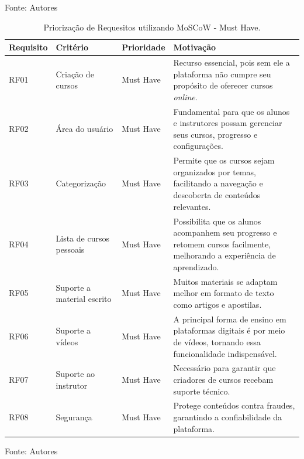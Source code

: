 \begin{apendicesenv}
\begin{table}[h]
\vspace{5mm}
{\footnotesize Fonte: Autores} 

\end{table}


\begin{table}[h]
    \centering
    \caption{Priorização de Requesitos utilizando MoSCoW - Must Have.}
    \label{tab:priorizacao_moscow}
    \begin{adjustbox}{width=\textwidth}
        \begin{tabular}{|p{2.5cm}|p{5cm}|p{5cm}|p{4cm}|}
        \hline
        \textbf{Requisito} & \textbf{Critério} & \textbf{Prioridade} & \textbf{Motivação} \\
        \hline
        RF01 & Criação de cursos & Must Have & Recurso essencial, pois sem ele a plataforma não cumpre seu propósito de oferecer cursos \textit{online}. \\
        \hline
        RF02 & Área do usuário & Must Have & Fundamental para que os alunos e instrutores possam gerenciar seus cursos, progresso e configurações. \\
        \hline
        RF03 & Categorização & Must Have & Permite que os cursos sejam organizados por temas, facilitando a navegação e descoberta de conteúdos relevantes. \\
        \hline
        RF04 & Lista de cursos pessoais & Must Have & Possibilita que os alunos acompanhem seu progresso e retomem cursos facilmente, melhorando a experiência de aprendizado. \\
        \hline
        RF05 & Suporte a material escrito & Must Have & Muitos materiais se adaptam melhor em formato de texto como artigos e apostilas. \\
        \hline
        RF06 & Suporte a vídeos & Must Have & A principal forma de ensino em plataformas digitais é por meio de vídeos, tornando essa funcionalidade indispensável. \\
        \hline
        RF07 & Suporte ao instrutor & Must Have & Necessário para garantir que criadores de cursos recebam suporte técnico. \\
        \hline
        RF08 & Segurança & Must Have & Protege conteúdos contra fraudes, garantindo a confiabilidade da plataforma. \\
        \hline
    \end{tabular}
\end{adjustbox}

\vspace{5mm}
{\footnotesize Fonte: Autores} 
\end{table}



\end{apendicesenv}
